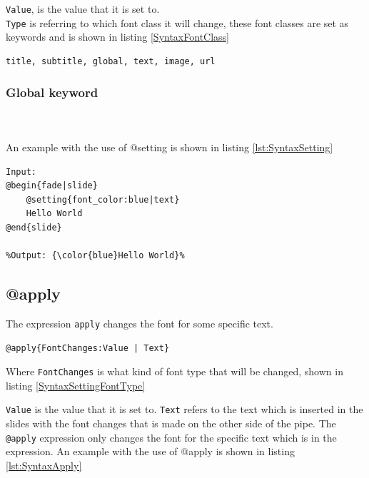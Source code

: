 {\texttt{Value}, is the value that it is set to. \\

\texttt{Type} is referring to which font class it will change, these font classes are set as keywords and is shown in listing \ref{SyntaxFontClass}
\begin{lstlisting}[frame=single, caption=Font class keyword, label=SyntaxFontClass]
title, subtitle, global, text, image, url
\end{lstlisting}

\subsubsection*{Global keyword}
\\ \\
An example with the use of @setting is shown in listing \ref{lst:SyntaxSetting}

\begin{lstlisting}[frame=single, caption=Hello World with setting, label=lst:SyntaxSetting]
Input:
@begin{fade|slide}
    @setting{font_color:blue|text}
    Hello World
@end{slide}

%Output: {\color{blue}Hello World}%
\end{lstlisting}

\subsection{@apply}
The expression \texttt{apply} changes the font for some specific text.
\begin{lstlisting}[frame=single, caption=apply expression generic]
@apply{FontChanges:Value | Text}
\end{lstlisting}
Where \texttt{FontChanges} is what kind of font type that will be changed, shown in listing \ref{SyntaxSettingFontType}

\texttt{Value} is the value that it is set to. 
\texttt{Text} refers to the text which is inserted in the slides with the font changes that is made on the other side of the pipe.
The \texttt{@apply} expression only changes the font for the specific text which is in the expression.
An example with the use of @apply is shown in listing \ref{lst:SyntaxApply}

}
